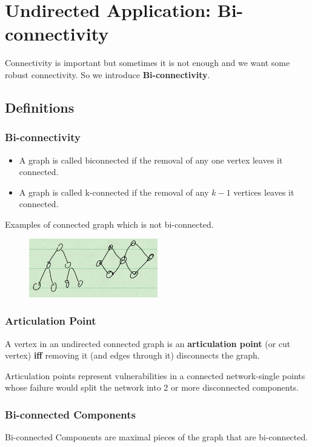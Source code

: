 \documentclass[en,hazy,blue,screen,14pt]{elegantnote}
\begin{document}
\section{Undirected Application: Bi-connectivity}
Connectivity is important but sometimes it is not enough and we want some 
robust connectivity. So we introduce \textbf{Bi-connectivity}.
\subsection{Definitions}
\subsubsection{Bi-connectivity}
\begin{itemize}
\item A graph is called biconnected if the removal of any one vertex leaves it 
connected.
\item A graph is called k-connected if the removal of any $k-1$ vertices leaves 
it connected.
\end{itemize}
Examples of connected graph which is not bi-connected.
\begin{figure}[H]
\centering
\includegraphics[width=0.5\textwidth]{bi-connectivity.png}
\end{figure}
\subsubsection{Articulation Point}
A vertex in an undirected connected graph is an \textbf{articulation point} (or 
cut vertex) \textbf{iff} removing it (and edges through it) disconnects the 
graph. 

Articulation points represent vulnerabilities in a connected 
network-single points whose failure would split the network into 2 or more 
disconnected components.

\subsubsection{Bi-connected Components}
Bi-connected Components are maximal pieces of the graph that are bi-connected.
\end{document}

